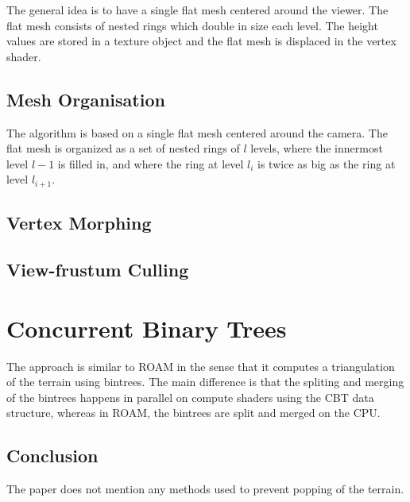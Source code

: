 The general idea is to have a single flat mesh centered around the viewer.
The flat mesh consists of nested rings which double in size each level.
The height values are stored in a texture object and the flat mesh is displaced in the vertex shader.

\subsection{Mesh Organisation}
The algorithm is based on a single flat mesh centered around the camera.
The flat mesh is organized as a set of nested rings of $l$ levels, 
where the innermost level $l-1$ is filled in, and where the ring at level $l_i$ is twice as big as the ring 
at level $l_{i+1}$. 

\subsection{Vertex Morphing}

\subsection{View-frustum Culling}


\section{Concurrent Binary Trees}
The approach is similar to ROAM in the sense that it computes a triangulation of the terrain using bintrees.
The main difference is that the spliting and merging of the bintrees happens in parallel on compute shaders using the 
CBT data structure, whereas in ROAM, the bintrees are split and merged on the CPU.

\subsection{Conclusion}
The paper does not mention any methods used to prevent popping of the terrain.


